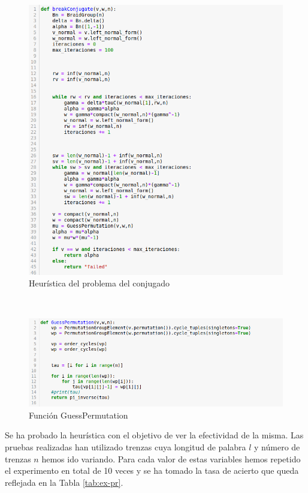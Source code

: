 \documentclass[12pt]{book}
\theoremstyle{definition}
\begin{document}
\begin{figure}[h!]
\centering
\includegraphics[scale=0.5]{imgs/breakConjugate.png} 
\caption{Heurística del problema del conjugado}
\label{img:alg_a}
\end{figure}
\ 
\newline
\newline
\begin{figure}[h!]
\centering
\includegraphics[scale=0.5]{imgs/GuessPermutation.png} 
\caption{Función GuessPermutation}
\label{img:guess_per}
\end{figure}

Se ha probado la heurística con el objetivo de ver la efectividad de la misma. Las pruebas realizadas han utilizado trenzas cuya longitud de palabra $l$ y número de trenzas $n$ hemos ido variando. Para cada valor de estas variables hemos repetido el experimento en total de 10 veces y se ha tomado la tasa de acierto que queda reflejada en la Tabla \ref{tab:ex-pr}.
\end{document}
